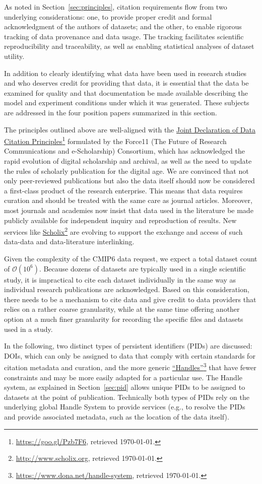 \documentclass[gmd,manuscript]{copernicus}
\newcommand{\pllabel}[1]{\label{p-#1}\linelabel{l-#1}}
\newcommand{\urlref}[2] {\href{#1}{#2}\footnote{\url{#1}, retrieved \today.}}
\begin{document}
As noted in Section~\ref{sec:principles}, citation requirements flow
from two underlying considerations: one, to provide proper credit and
formal acknowledgment of the authors of datasets; and the other, to
enable rigorous tracking of data provenance and data usage. The
tracking facilitates scientific reproducibility and traceability, as
well as enabling statistical analyses of dataset utility.

In addition to clearly identifying what data have been used in
research studies and who deserves credit for providing that data, it
is essential that the data be examined for quality and that
documentation be made available describing the model and experiment
conditions under which it was generated. These subjects are addressed
in the four position papers summarized in this section.

The principles outlined above are well-aligned with the
\urlref{https://goo.gl/Pzb7F6}{Joint Declaration of Data Citation
Principles} formulated by the Force11 (The Future of Research
Communications and e-Scholarship) Consortium, which has acknowledged
the rapid evolution of digital scholarship and archival, as well as
the need to update the rules of scholarly publication for the digital
age. We are convinced that not only peer-reviewed publications but
also the data itself should now be considered a first-class product of
the research enterprise. This means that data requires curation and
should be treated with the same care as journal articles. Moreover,
most journals and academies now insist that data used in the
literature be made publicly available for independent inquiry and
reproduction of results. New services like
\urlref{http://www.scholix.org}{Scholix} are evolving to support the
exchange and access of such data-data and data-literature
interlinking.

Given the complexity of the CMIP6 data request, we expect
 a total dataset count of $\mathcal{O}(10^6)$.
Because dozens of datasets are typically used in a single scientific
study, it is impractical to cite each dataset individually in the same
way as individual research publications are acknowledged. Based on
this consideration, there needs to be a mechanism to cite data
and give credit to data providers that relies on a rather coarse
granularity, while at the same time offering another option at a much
finer granularity for recording the specific files and datasets used
in a study.

In the following, two distinct types of persistent identifiers (PIDs)
are discussed: DOIs, which can only be assigned to data that comply
with certain standards for citation metadata and curation, and the
more generic
\pllabel{RC1-37}
\urlref{https://www.dona.net/handle-system}{``Handles''} that have
fewer constraints and may be more easily adapted for a particular use.
\pllabel{RC2-31}
The Handle system, as explained in Section~\ref{sec:pid} allows
unique PIDs to be assigned to datasets at the point of publication.
Technically both types of PIDs rely on the underlying global Handle
System to provide services (e.g., to resolve the PIDs and provide
associated metadata, such as the location of the data itself).
\end{document}
